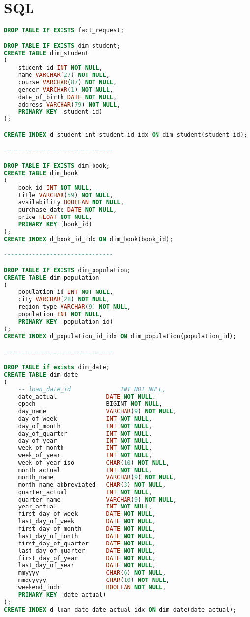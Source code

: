 \section{SQL} 
\label{appendix:init_sql}


\begin{lstlisting}[language=SQL, caption={init.sql}, label={lst:init_sql}]
DROP TABLE IF EXISTS fact_request;

DROP TABLE IF EXISTS dim_student;
CREATE TABLE dim_student
(
    student_id INT NOT NULL,
    name VARCHAR(27) NOT NULL,
    course VARCHAR(87) NOT NULL,
    gender VARCHAR(1) NOT NULL,
    date_of_birth DATE NOT NULL,
    address VARCHAR(79) NOT NULL,
    PRIMARY KEY (student_id)
);

CREATE INDEX d_student_int_student_id_idx ON dim_student(student_id);

-------------------------------

DROP TABLE IF EXISTS dim_book;
CREATE TABLE dim_book
(
    book_id INT NOT NULL,
    title VARCHAR(59) NOT NULL,
    availability BOOLEAN NOT NULL,
    purchase_date DATE NOT NULL,
    price FLOAT NOT NULL,
    PRIMARY KEY (book_id)
);
CREATE INDEX d_book_id_idx ON dim_book(book_id);

-------------------------------

DROP TABLE IF EXISTS dim_population;
CREATE TABLE dim_population
(
    population_id INT NOT NULL,
    city VARCHAR(28) NOT NULL,
    region_type VARCHAR(9) NOT NULL,
    population INT NOT NULL,
    PRIMARY KEY (population_id)
);
CREATE INDEX d_population_id_idx ON dim_population(population_id);

-------------------------------

DROP TABLE if exists dim_date;
CREATE TABLE dim_date
(
    -- loan_date_id              INT NOT NULL,
    date_actual              DATE NOT NULL,
    epoch                    BIGINT NOT NULL,
    day_name                 VARCHAR(9) NOT NULL,
    day_of_week              INT NOT NULL,
    day_of_month             INT NOT NULL,
    day_of_quarter           INT NOT NULL,
    day_of_year              INT NOT NULL,
    week_of_month            INT NOT NULL,
    week_of_year             INT NOT NULL,
    week_of_year_iso         CHAR(10) NOT NULL,
    month_actual             INT NOT NULL,
    month_name               VARCHAR(9) NOT NULL,
    month_name_abbreviated   CHAR(3) NOT NULL,
    quarter_actual           INT NOT NULL,
    quarter_name             VARCHAR(9) NOT NULL,
    year_actual              INT NOT NULL,
    first_day_of_week        DATE NOT NULL,
    last_day_of_week         DATE NOT NULL,
    first_day_of_month       DATE NOT NULL,
    last_day_of_month        DATE NOT NULL,
    first_day_of_quarter     DATE NOT NULL,
    last_day_of_quarter      DATE NOT NULL,
    first_day_of_year        DATE NOT NULL,
    last_day_of_year         DATE NOT NULL,
    mmyyyy                   CHAR(6) NOT NULL,
    mmddyyyy                 CHAR(10) NOT NULL,
    weekend_indr             BOOLEAN NOT NULL,
    PRIMARY KEY (date_actual)
);
CREATE INDEX d_loan_date_date_actual_idx ON dim_date(date_actual);


\end{lstlisting}
